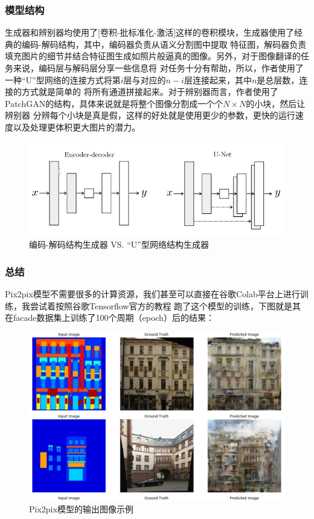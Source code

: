 \documentclass[supercite]{HustGraduPaper}
\theoremstyle{definition}
\begin{document}
\subsubsection{模型结构}

生成器和辨别器均使用了[卷积-批标准化-激活]这样的卷积模块，生成器使用了经典的编码-解码结构，其中，编码器负责从语义分割图中提取
特征图，解码器负责填充图片的细节并结合特征图生成如照片般逼真的图像。另外，对于图像翻译的任务来说，编码层与解码层分享一些信息将
对任务十分有帮助，所以，作者使用了一种“U”型网络的连接方式将第$i$层与对应的$n-i$层连接起来，其中$n$是总层数，连接的方式就是简单的
将所有通道拼接起来。对于辨别器而言，作者使用了PatchGAN的结构，具体来说就是将整个图像分割成一个个$N \times N$的小块，然后让辨别器
分辨每个小块是真是假，这样的好处就是使用更少的参数，更快的运行速度以及处理更体积更大图片的潜力。
\begin{figure}[H]
  \begin{center}
  \includegraphics[width=12cm]{images/pix2pix-generator}
  \end{center}
  \caption{编码-解码结构生成器 VS. “U”型网络结构生成器}
  \label{fig:pix2pix-generator}
\end{figure}

\subsubsection{总结}

Pix2pix模型不需要很多的计算资源，我们甚至可以直接在谷歌Colab平台上进行训练，我尝试着按照谷歌Tensorflow官方的教程\cite{tf-pix2pix-tutorial}
跑了这个模型的训练，下图就是其在facade数据集\cite{Tylecek13}上训练了100个周期（epoch）后的结果：
\begin{figure}[H]
  \begin{center}
  \includegraphics[width=12cm]{images/pix2pix-output}
  \end{center}
  \caption{Pix2pix模型的输出图像示例}
  \label{fig:pix2pix-output}
\end{figure}
\end{document}
